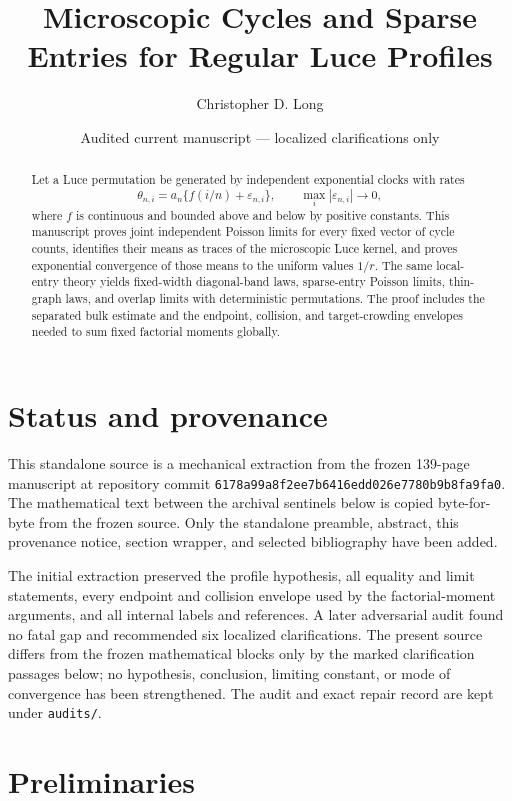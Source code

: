 \documentclass[11pt]{article}
\title{Microscopic Cycles and Sparse Entries for Regular Luce Profiles}
\author{Christopher D. Long}
\date{Audited current manuscript --- localized clarifications only}
\theoremstyle{remark}
\begin{document}
\maketitle

\begin{abstract}
Let a Luce permutation be generated by independent exponential clocks with
rates
\[
 \theta_{n,i}=a_n\{f(i/n)+\varepsilon_{n,i}\},
 \qquad \max_i|\varepsilon_{n,i}|\longrightarrow0,
\]
where \(f\) is continuous and bounded above and below by positive constants.
This manuscript proves joint independent Poisson limits for every fixed vector
of cycle counts, identifies their means as traces of the microscopic Luce
kernel, and proves exponential convergence of those means to the uniform
values \(1/r\).  The same local-entry theory yields fixed-width diagonal-band
laws, sparse-entry Poisson limits, thin-graph laws, and overlap limits with
deterministic permutations.  The proof includes the separated bulk estimate
and the endpoint, collision, and target-crowding envelopes needed to sum fixed
factorial moments globally.
\end{abstract}

\tableofcontents

\section{Status and provenance}

This standalone source is a mechanical extraction from the frozen
139-page manuscript at repository commit
\texttt{6178a99a8f2ee7b6416edd026e7780b9b8fa9fa0}.  The mathematical text
between the archival sentinels below is copied byte-for-byte from the frozen
source.  Only the standalone preamble, abstract, this provenance notice,
section wrapper, and selected bibliography have been added.

The initial extraction preserved the profile hypothesis, all equality and
limit statements, every endpoint and collision envelope used by the
factorial-moment arguments, and all internal labels and references.  A later
adversarial audit found no fatal gap and recommended six localized
clarifications.  The present source differs from the frozen mathematical
blocks only by the marked clarification passages below; no hypothesis,
conclusion, limiting constant, or mode of convergence has been strengthened.
The audit and exact repair record are kept under \texttt{audits/}.

\section{Preliminaries}
\end{document}
